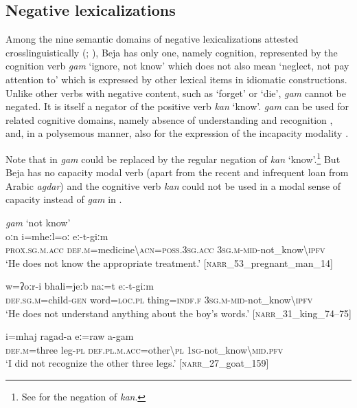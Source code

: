 \documentclass[output=paper,colorlinks,citecolor=brown]{langscibook}
\begin{document}
\subsection{Negative lexicalizations}

Among the nine semantic domains of negative lexicalizations attested crosslinguistically (\citealt{Zeshan2004}; \citealt{Veselinova2013neg.exist}), Beja has only one, namely cognition, represented by the cognition verb \textit{gam} ‘ignore, not know’  which does not also mean ‘neglect, not pay attention to’ which is expressed by other lexical items in idiomatic constructions. Unlike other verbs with negative content, such as ‘forget’ or ‘die’, \textit{gam} cannot be negated. It is itself a negator of the positive verb \textit{kan} ‘know’. \textit{gam} can be used for related cognitive domains, namely absence of understanding  and recognition , and, in a polysemous manner, also for the expression of the incapacity modality .

Note that in  \textit{gam} could be replaced by the regular negation of \textit{kan} ‘know’.\footnote{See  for the negation of \textit{kan}.} But Beja has no capacity modal verb (apart from the recent and infrequent loan from Arabic \textit{agdar}) and the cognitive verb \textit{kan} could not be used in a modal sense of capacity instead of \textit{gam} in .

\newpage
\ea\label{ex:beja:28}
\textit{gam} ‘not know’\\
    \ea\label{ex:beja:28a}
         \gll oːn i=mheːl=oː eː-t-giːm\\
             \textsc{prox.sg.m.acc} \textsc{def.m}=medicine{\textbackslash}\textsc{acn=poss.3sg.acc} \textsc{3sg.m-mid}{}-not\_know{\textbackslash}\textsc{ipfv}\\
        \glt `He does not know the appropriate treatment.' [\textsc{narr}\_53\_pregnant\_man\_14]
    
    \ex\label{ex:beja:28b}    
         \gll w=ʔoːr-i   bhali=jeːb  naː=t eː-t-giːm\\
             \textsc{def.sg.m}=child-\textsc{gen} word=\textsc{loc.pl} thing=\textsc{indf.f} \textsc{3sg.m}{}-\textsc{mid}{}-not\_know{\textbackslash}\textsc{ipfv}\\
        \glt `He does not understand anything about the boy’s words.' [\textsc{narr}\_31\_king\_74–75]

    \ex\label{ex:beja:28c}
         \gll i=mhaj ragad-a eː=raw a-gam\\
             \textsc{def.m}=three leg-\textsc{pl} \textsc{def.pl.m.acc}=other{\textbackslash}\textsc{pl} \textsc{1sg}-not\_know{\textbackslash}\textsc{mid.pfv}\\
        \glt `I did not recognize the other three legs.' [\textsc{narr}\_27\_goat\_159]
        
\end{document}

